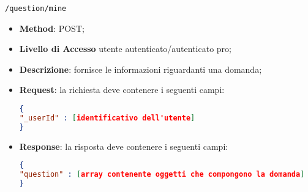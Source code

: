 	\item \texttt{/question/mine}
		\begin{itemize}
			\item \textbf{Method}: POST;
			\item \textbf{Livello di Accesso} utente autenticato/autenticato pro;
			\item \textbf{Descrizione}: fornisce le informazioni riguardanti una domanda;
			\item \textbf{Request}: la richiesta deve contenere i seguenti campi:
\begin{lstlisting}[language=json,firstnumber=1]
{
"_userId" : [identificativo dell'utente]
}
\end{lstlisting}
			\item \textbf{Response}: la risposta deve contenere i seguenti campi:
\begin{lstlisting}[language=json,firstnumber=1]
{
"question" : [array contenente oggetti che compongono la domanda]
}
\end{lstlisting}
		\end{itemize}